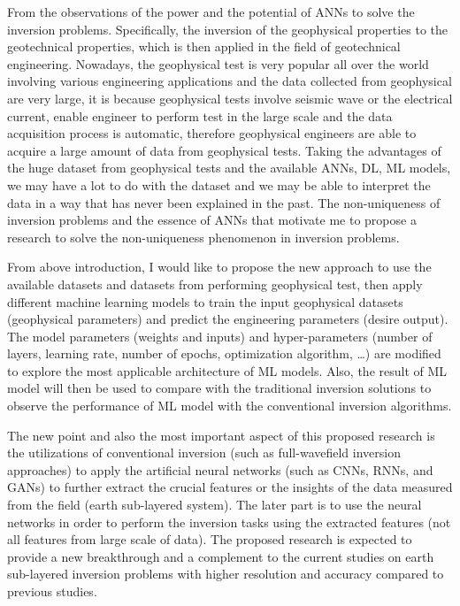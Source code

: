From the observations of the power and the potential of ANNs to solve the inversion problems. Specifically, the inversion of the geophysical properties to the geotechnical properties, which is then applied in the field of geotechnical engineering. Nowadays, the geophysical test is very popular all over the world involving various engineering applications and the data collected from geophysical are very large, it is because geophysical tests involve seismic wave or the electrical current, enable engineer to perform test in the large scale and the data acquisition process is automatic, therefore geophysical engineers are able to acquire a large amount of data from geophysical tests. Taking the advantages of the huge dataset from geophysical tests and the available ANNs, DL, ML models, we may have a lot to do with the dataset and we may be able to interpret the data in a way that has never been explained in the past. The non-uniqueness of inversion problems and the essence of ANNs that motivate me to propose a research to solve the non-uniqueness phenomenon in inversion problems. 
  
From above introduction, I would like to propose the new approach to use the available datasets and datasets from performing geophysical test, then apply different machine learning models to train the input geophysical datasets (geophysical parameters) and predict the engineering parameters (desire output). The model parameters (weights and inputs) and hyper-parameters (number of layers, learning rate, number of epochs, optimization algorithm, …) are modified to explore the most applicable architecture of ML models. Also, the result of ML model will then be used to compare with the traditional inversion solutions to observe the performance of ML model with the conventional inversion algorithms.

The new point and also the most important aspect of this proposed research is the utilizations of conventional inversion (such as full-wavefield inversion approaches) to apply the artificial neural networks (such as CNNs, RNNs, and GANs) to further extract the crucial features or the insights of the data measured from the field (earth sub-layered system). The later part is to use the neural networks in order to perform the inversion tasks using the extracted features (not all features from large scale of data). The proposed research is expected to provide a new breakthrough and a complement to the current studies on earth sub-layered inversion problems with higher resolution and accuracy compared to previous studies.
